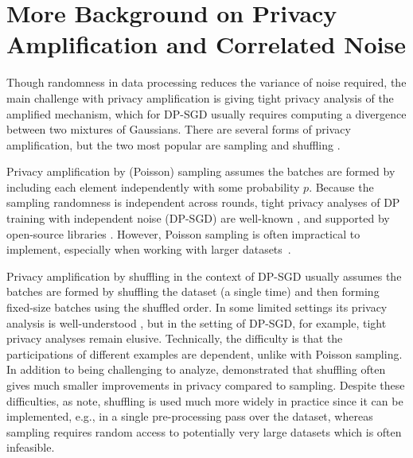 \section{More Background on Privacy Amplification and Correlated Noise}\label{app:background}

 Though randomness in data processing reduces the variance of noise required, the main challenge with privacy amplification is giving tight privacy analysis of the amplified mechanism, which for DP-SGD usually requires computing a divergence between two mixtures of Gaussians. There are several forms of privacy amplification, but the two most popular are sampling \cite{DP-DL, BBG18} and shuffling \cite{balle2018improving, erlingsson2019private, PAS, feldman22hiding}.

Privacy amplification by (Poisson) sampling assumes the batches are formed by including each element independently with some probability $p$. Because the sampling randomness is independent across rounds, tight privacy analyses of DP training with independent noise (DP-SGD) are well-known \cite{koskela21tight}, and supported by open-source libraries  \cite{dp_accounting}. However, Poisson sampling is often impractical to implement, especially when working with larger datasets~\cite{ponomareva23dpfy}.

Privacy amplification by shuffling in the context of DP-SGD usually assumes the batches are formed by shuffling the dataset (a single time) and then forming fixed-size batches using the shuffled order. In some limited settings its privacy analysis is well-understood \cite{feldman22hiding}, but in the setting of DP-SGD, for example, tight privacy analyses remain elusive. Technically, the difficulty is that the participations of different examples are dependent, unlike with Poisson sampling. In addition to being challenging to analyze, \citet{chua2024private} demonstrated that shuffling often gives much smaller improvements in privacy compared to sampling. Despite these difficulties, as \citet{chua2024private} note, shuffling is used much more widely in practice since it can be implemented, e.g., in a single pre-processing pass over the dataset, whereas sampling requires random access to potentially very large datasets which is often infeasible.


